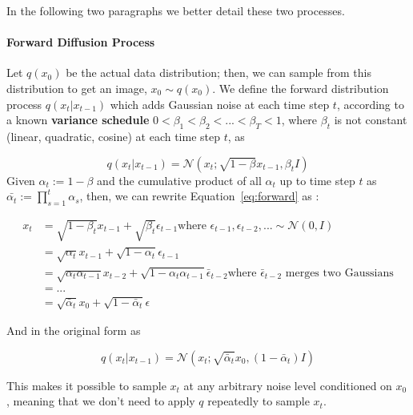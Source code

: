 \documentclass[sn-mathphys,Numbered]{sn-jnl}
\theoremstyle{thmstyleone}%
\theoremstyle{thmstyletwo}%
\theoremstyle{thmstylethree}%
\begin{document}
In the following two paragraphs we better detail these two processes.

\paragraph{Forward Diffusion Process} Let $q(x_0)$ be the actual data distribution; then, we can sample from this distribution to get an image, $x_0 \sim q(x_0)$. 
We define the forward distribution process $q(x_t|x_{t-1})$ which adds Gaussian noise at each time step $t$, 
according to a known \textbf{variance schedule} $0<\beta_1<\beta_2<...<\beta_T<1$, where $\beta_t$ 
is not constant (linear, quadratic, cosine) at each time step $t$,  as

\begin{equation} \label{eq:forward}
	q(x_t|x_{t-1}) = \mathcal{N}(x_t; \sqrt{1-\beta}x_{t-1}, \beta_t I)
\end{equation}
Given $\alpha_t:=1-\beta$ and the cumulative product of all $\alpha_t$ up to time step $t$ as 
$\bar{\alpha_t} := \prod_{s=1}^t\alpha_s$, then, we can rewrite Equation~\ref{eq:forward} as \cite{weng2021diffusion}:

\begin{equation}
	\begin{split}
		x_t & = \sqrt{1-\beta_t}x_{t-1} + \sqrt{\beta_t}\epsilon_{t-1}
		\text{where $\epsilon_{t-1},\epsilon_{t-2},... \sim \mathcal{N}(0,I)$}\\
		& = \sqrt{\alpha_t}x_{t-1} + \sqrt{1-\alpha_t}\epsilon_{t-1} \\
		& = \sqrt{\alpha_t\alpha_{t-1}}x_{t-2} + \sqrt{1-\alpha_t\alpha_{t-1}}\bar{\epsilon}_{t-2} 
		\text{where $\bar{\epsilon}_{t-2}$ merges two Gaussians}\\
		& = ... \\
		& = \sqrt{\bar{\alpha}_t}x_0 + \sqrt{1-\bar{\alpha}_t}\epsilon 
	\end{split}
\end{equation}

And in the original form as

\begin{equation} \label{eq:forward2}
	q(x_t|x_{t-1}) = \mathcal{N}(x_t; \sqrt{\bar{\alpha}_t}x_0, (1 -\bar{\alpha}_t) I)
\end{equation}

This makes it possible to sample $x_t$ at any arbitrary noise level conditioned on $x_0$,
meaning that we don't need to apply $q$ repeatedly to sample $x_t$.
\end{document}
